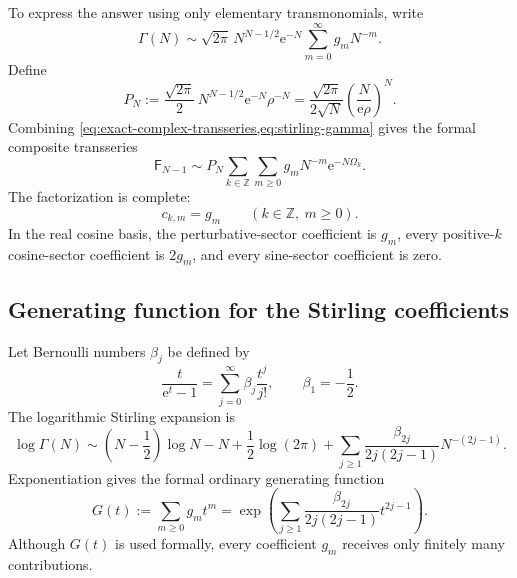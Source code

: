 \documentclass[11pt,oneside]{article}
\numberwithin{equation}{section}
\newcommand{\e}{\mathrm e}
\newcommand{\Z}{\mathbb Z}
\newcommand{\Fub}{\mathsf F}
\newcommand{\paren}[1]{\left(#1\right)}
\begin{document}
To express the answer using only elementary transmonomials, write
\begin{equation}
 \Gamma(N)\sim\sqrt{2\pi}\,N^{N-1/2}\e^{-N}
 \sum_{m=0}^{\infty}g_mN^{-m}.
 \label{eq:stirling-gamma}
\end{equation}
Define
\begin{equation}
 P_N:=\frac{\sqrt{2\pi}}{2}\,N^{N-1/2}\e^{-N}\rho^{-N}
 =\frac{\sqrt{2\pi}}{2\sqrt N}\paren{\frac{N}{\e\rho}}^N.
 \label{eq:elementary-prefactor}
\end{equation}
Combining \cref{eq:exact-complex-transseries,eq:stirling-gamma} gives the formal composite transseries
\begin{equation}
 \boxed{\displaystyle
 \Fub_{N-1}\sim P_N
 \sum_{k\in\Z}\sum_{m\ge0}
 g_mN^{-m}\e^{-N\Omega_k}.}
 \label{eq:double-transseries}
\end{equation}
The factorization is complete:
\begin{equation}
 \boxed{c_{k,m}=g_m\qquad(k\in\Z,\ m\ge0).}
 \label{eq:sector-coefficient-factorization}
\end{equation}
In the real cosine basis, the perturbative-sector coefficient is \(g_m\), every positive-\(k\) cosine-sector coefficient is \(2g_m\), and every sine-sector coefficient is zero.

\subsection{Generating function for the Stirling coefficients}

Let Bernoulli numbers \(\beta_j\) be defined by
\begin{equation}
 \frac{t}{\e^t-1}=\sum_{j=0}^{\infty}\beta_j\frac{t^j}{j!},
 \qquad \beta_1=-\frac12.
 \label{eq:bernoulli-definition}
\end{equation}
The logarithmic Stirling expansion is
\begin{equation}
 \log\Gamma(N)
 \sim\paren{N-\frac12}\log N-N+\frac12\log(2\pi)
 +\sum_{j\ge1}\frac{\beta_{2j}}{2j(2j-1)}N^{-(2j-1)}.
 \label{eq:log-gamma-stirling}
\end{equation}
Exponentiation gives the formal ordinary generating function
\begin{equation}
 \boxed{\displaystyle
 G(t):=\sum_{m\ge0}g_mt^m
 =\exp\!\left(
   \sum_{j\ge1}\frac{\beta_{2j}}{2j(2j-1)}t^{2j-1}
 \right).}
 \label{eq:stirling-coeff-generating}
\end{equation}
Although \(G(t)\) is used formally, every coefficient \(g_m\) receives only finitely many contributions.
\end{document}
